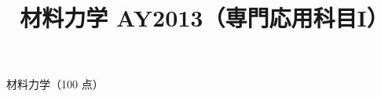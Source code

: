\documentclass[11pt,a4paper]{article}
\title{材料力学 AY2013（専門応用科目I）}
\author{}
\date{}
\begin{document}
\maketitle

\noindent
材料力学\hfill（100 点）

\bigskip

\clearpage

\end{document}
